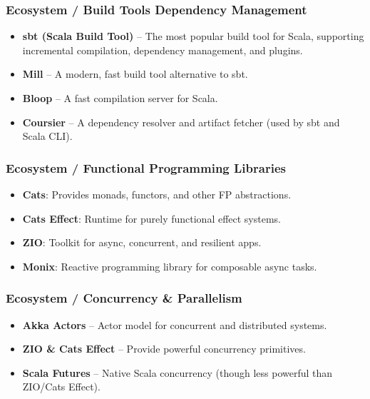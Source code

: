 \documentclass{beamer}
\begin{document}

\begin{frame}
\frametitle{Ecosystem / Build Tools \text{\&} Dependency Management }

\begin{itemize}
    \item \textbf{sbt (Scala Build Tool)} – The most popular build tool for Scala, supporting incremental compilation, dependency management, and plugins.
    \item \textbf{Mill} – A modern, fast build tool alternative to sbt.
    \item \textbf{Bloop} – A fast compilation server for Scala.
    \item \textbf{Coursier} – A dependency resolver and artifact fetcher (used by sbt and Scala CLI).
\end{itemize}

\end{frame}


\begin{frame}
\frametitle{Ecosystem / Functional Programming Libraries }

\begin{itemize}
  \item \textbf{Cats}: Provides monads, functors, and other FP abstractions.
  \item \textbf{Cats Effect}: Runtime for purely functional effect systems.
  \item \textbf{ZIO}: Toolkit for async, concurrent, and resilient apps.
  \item \textbf{Monix}: Reactive programming library for composable async tasks.
\end{itemize}

\end{frame}


\begin{frame}
\frametitle{Ecosystem / Concurrency \& Parallelism }

\begin{itemize}
  \item \textbf{Akka Actors} – Actor model for concurrent and distributed systems.
  \item \textbf{ZIO \& Cats Effect} – Provide powerful concurrency primitives.
  \item \textbf{Scala Futures} – Native Scala concurrency (though less powerful than ZIO/Cats Effect).
\end{itemize}

\end{frame}
\end{document}
